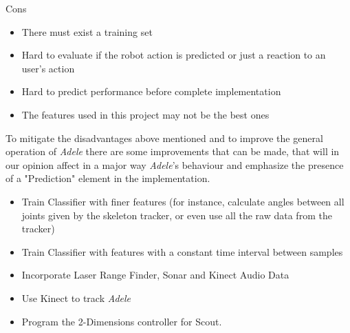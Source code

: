 \centerline{Cons}
\begin{itemize}
\item There must exist a training set
\item Hard to evaluate if the robot action is predicted or just a reaction to an user's action
\item Hard to predict performance before complete implementation
\item The features used in this project may not be the best ones
\end{itemize}

To mitigate the disadvantages above mentioned and to improve the general operation of \textit{Adele} there are some improvements that can be made, that will in our opinion affect in a major way \textit{Adele}'s behaviour and emphasize the presence of a "Prediction" element in the implementation.

\begin{itemize}
\item Train Classifier with finer features (for instance, calculate angles between all joints given by the skeleton tracker, or even use all the raw data from the tracker)
\item Train Classifier with features with a constant time interval between samples
\item Incorporate Laser Range Finder, Sonar and Kinect Audio Data
\item Use Kinect to track \textit{Adele}
\item Program the 2-Dimensions controller for Scout.
\end{itemize}
